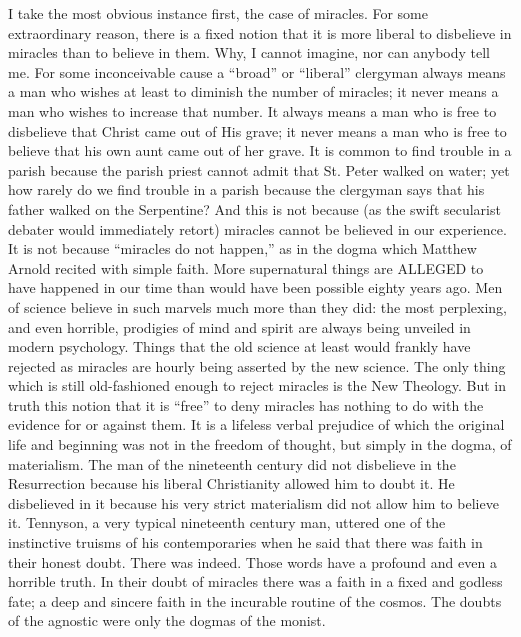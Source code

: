 I take the most obvious instance first, the case of miracles. For some extraordinary reason, there is a fixed notion that it is more liberal to disbelieve in miracles than to believe in them. Why, I cannot imagine, nor can anybody tell me. For some inconceivable cause a “broad” or “liberal” clergyman always means a man who wishes at least to diminish the number of miracles; it never means a man who wishes to increase that number. It always means a man who is free to disbelieve that Christ came out of His grave; it never means a man who is free to believe that his own aunt came out of her grave. It is common to find trouble in a parish because the parish priest cannot admit that St. Peter walked on water; yet how rarely do we find trouble in a parish because the clergyman says that his father walked on the Serpentine? And this is not because (as the swift secularist debater would immediately retort) miracles cannot be believed in our experience. It is not because “miracles do not happen,” as in the dogma which Matthew Arnold recited with simple faith. More supernatural things are ALLEGED to have happened in our time than would have been possible eighty years ago. Men of science believe in such marvels much more than they did: the most perplexing, and even horrible, prodigies of mind and spirit are always being unveiled in modern psychology. Things that the old science at least would frankly have rejected as miracles are hourly being asserted by the new science. The only thing which is still old-fashioned enough to reject miracles is the New Theology. But in truth this notion that it is “free” to deny miracles has nothing to do with the evidence for or against them. It is a lifeless verbal prejudice of which the original life and beginning was not in the freedom of thought, but simply in the dogma, of materialism. The man of the nineteenth century did not disbelieve in the Resurrection because his liberal Christianity allowed him to doubt it. He disbelieved in it because his very strict materialism did not allow him to believe it. Tennyson, a very typical nineteenth century man, uttered one of the instinctive truisms of his contemporaries when he said that there was faith in their honest doubt. There was indeed. Those words have a profound and even a horrible truth. In their doubt of miracles there was a faith in a fixed and godless fate; a deep and sincere faith in the incurable routine of the cosmos. The doubts of the agnostic were only the dogmas of the monist.


